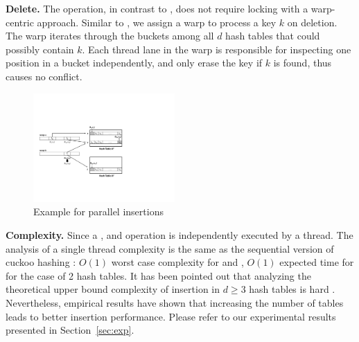 \vspace{1mm}\noindent\textbf{Delete.} The  operation, in contrast to , does not require locking with a warp-centric approach. 
Similar to , we assign a warp to process a key $k$ on deletion. The warp iterates through the buckets among all $d$ hash tables that could possibly contain $k$. Each thread lane in the warp is responsible for inspecting one position in a bucket independently, and only erase the key if $k$ is found, thus causes no conflict.



\begin{figure}[t]
	\centering
	\includegraphics[width=0.48\textwidth]{fig/Voter.pdf}
	\vspace{-1em}
	\caption{Example for parallel insertions}
	\label{fig:voter}
\end{figure}
\vspace{1mm}\noindent\textbf{Complexity.}
Since a ,  and  operation is independently executed by a thread. 
The analysis of a single thread complexity is the same as the sequential version of cuckoo hashing \cite{pagh2004cuckoo}: $O(1)$ worst case complexity for  and , $O(1)$ expected time for  for the case of 2 hash tables. 
It has been pointed out that analyzing the theoretical upper bound complexity of insertion in $d \geq 3$ hash tables is hard \cite{alcantara2009real}.  
Nevertheless, empirical results have shown that increasing the number of tables leads to better insertion performance. Please refer to our experimental results presented in Section~\ref{sec:exp}.

